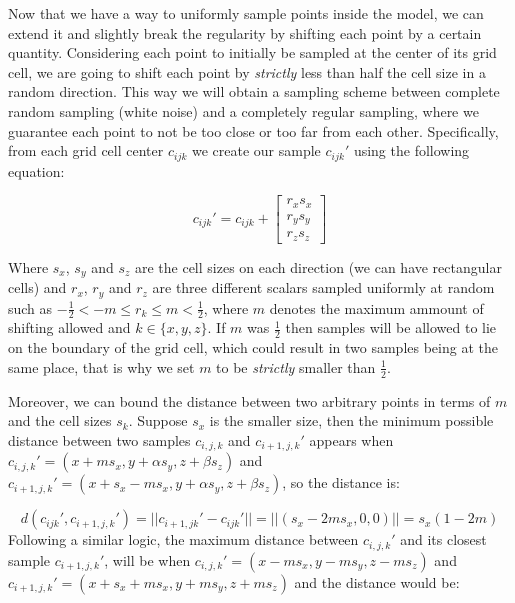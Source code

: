 \vspace{10pt}

Now that we have a way to uniformly sample points inside the model, we can 
extend it and slightly break the regularity by shifting each point by a 
certain quantity. Considering each point to initially be sampled at the 
center of its grid cell, we are going to shift each point by \textit{strictly}
less than half the cell size in a random direction. This way we will 
obtain a sampling scheme between complete random sampling (white noise) and 
a completely regular sampling, where we guarantee each point to not be too 
close or too far from each other. Specifically, from each grid cell center $c_{ijk}$
we create our sample $c_{ijk}'$ using the following equation:

\begin{equation}
    c_{ijk}' = c_{ijk} + \begin{bmatrix} r_xs_x \\ r_ys_y \\ r_zs_z \end{bmatrix}
\end{equation}

Where $s_x$, $s_y$ and $s_z$ are the cell sizes on each direction (we can have 
rectangular cells) and $r_x$, $r_y$ and $r_z$ are three different scalars sampled 
uniformly at random such as $-\frac{1}{2} < -m \leq r_k \leq m < \frac{1}{2}$, where 
$m$ denotes the maximum ammount of shifting allowed and $k \in \{x,y,z\}$. If $m$ 
was $\frac{1}{2}$ then samples will be allowed to lie on the boundary of the 
grid cell, which could result in two samples being at the same place, that is 
why we set $m$ to be \textit{strictly} smaller than $\frac{1}{2}$. 

\vspace{10pt}

Moreover, we can bound the distance between two arbitrary points in terms 
of $m$ and the cell sizes $s_k$. Suppose $s_x$ is the smaller size, 
then the minimum possible distance between two samples $c_{i,j,k}$ 
and $c_{i + 1,j,k}'$ appears when $c_{i,j,k}' = (x + m s_x, y + \alpha s_y, z + \beta s_z)$ 
and $c_{i + 1,j,k}' = (x + s_x - m s_x, y + \alpha s_y, z + \beta s_z)$, so the distance 
is:

\begin{equation}
d(c_{ijk}', c_{i + 1,j,k}') = ||c_{i + 1,jk}' - c_{ijk}'|| = ||(s_x - 2ms_x, 0, 0)|| = s_x(1 - 2m)
\end{equation}
Following a similar logic, the maximum distance between $c_{i,j,k}'$  and its closest sample $c_{i + 1, j, k}'$,
will be when $c_{i,j,k}' = (x - m s_x, y - m s_y, z - m s_z)$ and $c_{i + 1,j,k}' = (x + s_x + m s_x, y + m s_y, z + m s_z)$ and the distance 
would be:

